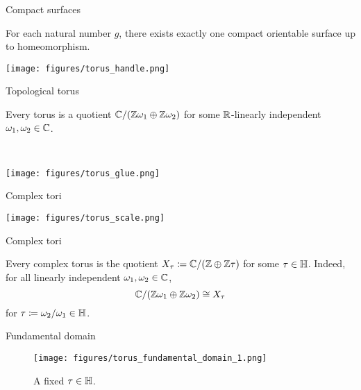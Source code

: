 \documentclass{beamer}
\begin{document}
    \begin{frame}{Compact surfaces}
        \begin{theorem}
            For each natural number $g$, there exists exactly one compact orientable surface up to homeomorphism.
        \end{theorem}

        \pause

        \begin{center}
            \texttt{[image: figures/torus\_handle.png]}
        \end{center}
    \end{frame}
    \begin{frame}{Topological torus}
        \begin{theorem}
            Every torus is a quotient $\mathbb{C}/\!\left(\mathbb{Z}\omega_1\oplus\mathbb{Z}\omega_2\right)$ for some $\mathbb{R}$-linearly independent $\omega_1,\omega_2\in\mathbb{C}$.
        \end{theorem}

        \pause\ \\

        \begin{center}
            \texttt{[image: figures/torus\_glue.png]}
        \end{center}
    \end{frame}
    \begin{frame}{Complex tori}
        \begin{center}
            \texttt{[image: figures/torus\_scale.png]}
        \end{center}
    \end{frame}
    \begin{frame}{Complex tori}
        \begin{theorem}
            Every complex torus is the quotient $X_\tau\coloneqq\mathbb{C}/\!\left(\mathbb{Z}\oplus\mathbb{Z}\tau\right)$ for some $\tau\in\mathbb{H}$. Indeed, for all linearly independent $\omega_1,\omega_2\in\mathbb{C}$,
            \begin{equation*}
                \mathbb{C}/\!\left(\mathbb{Z}\omega_1\oplus\mathbb{Z}\omega_2\right)\cong X_\tau
            \end{equation*}
            for $\tau\coloneqq\omega_2/\omega_1\in\mathbb{H}$.
        \end{theorem}
    \end{frame}
    \begin{frame}{Fundamental domain}
        \begin{figure}
            \texttt{[image: figures/torus\_fundamental\_domain\_1.png]}
            \caption{A fixed $\tau\in\mathbb{H}$.}
        \end{figure}
    \end{frame}
\end{document}
